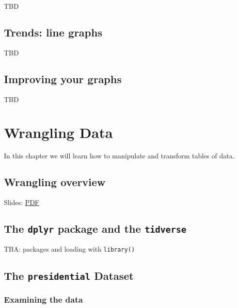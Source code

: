 \documentclass[
]{article}
\theoremstyle{definition}
\theoremstyle{definition}
\theoremstyle{definition}
\theoremstyle{definition}
\theoremstyle{remark}
\begin{document}
TBD

\hypertarget{trends-line-graphs}{%
\subsection{Trends: line graphs}\label{trends-line-graphs}}

TBD

\hypertarget{improving-your-graphs}{%
\subsection{Improving your graphs}\label{improving-your-graphs}}

TBD

\newpage

\hypertarget{wrangling-data}{%
\section{Wrangling Data}\label{wrangling-data}}

In this chapter we will learn how to manipulate and transform tables of data.

\hypertarget{wrangling-overview}{%
\subsection{Wrangling overview}\label{wrangling-overview}}

Slides: \href{https://drive.google.com/file/d/1LssVpGMhlblGewJtwO3NgdSZO-FF0uQQ}{PDF}

\hypertarget{the-dplyr-package-and-the-tidverse}{%
\subsection{\texorpdfstring{The \texttt{dplyr} package and the \texttt{tidverse}}{The dplyr package and the tidverse}}\label{the-dplyr-package-and-the-tidverse}}

TBA: packages and loading with \texttt{library()}

\hypertarget{the-presidential-dataset}{%
\subsection{\texorpdfstring{The \texttt{presidential} Dataset}{The presidential Dataset}}\label{the-presidential-dataset}}

\hypertarget{examining-the-data}{%
\subsubsection{Examining the data}\label{examining-the-data}}
\end{document}
